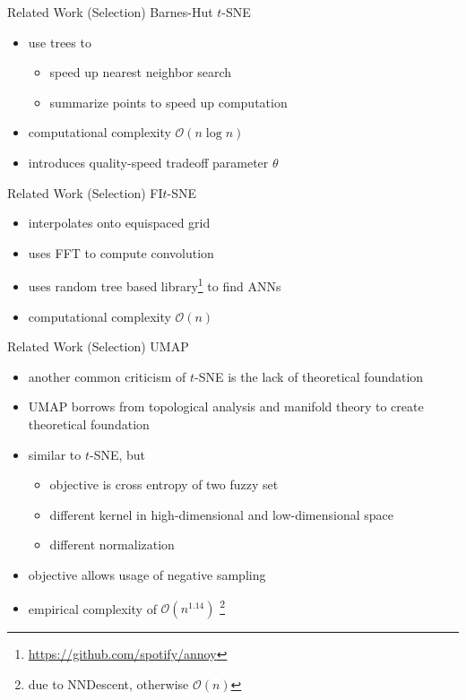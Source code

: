 \documentclass{beamer}
\begin{document}
\begin{frame}[fragile]{Related Work (Selection)}
    Barnes-Hut $t$-SNE
    \begin{itemize}
        \item use trees to
            \begin{itemize}
                \item speed up nearest neighbor search
                \item summarize points to speed up computation
            \end{itemize}
        \item computational complexity $\mathcal{O}(n \log n)$
        \item introduces quality-speed tradeoff parameter $\theta$
    \end{itemize}
\end{frame}

\begin{frame}[fragile]{Related Work (Selection)}
    FI$t$-SNE
    \begin{itemize}
        \item interpolates onto equispaced grid
        \item uses FFT to compute convolution
        \item uses random tree based library\footnote{\url{https://github.com/spotify/annoy}} to find ANNs
        \item computational complexity $\mathcal{O}(n)$
    \end{itemize}
\end{frame}

\begin{frame}[fragile]{Related Work (Selection)}
    UMAP
    \begin{itemize}
        \item another common criticism of $t$-SNE is the lack of theoretical foundation
        \item UMAP borrows from topological analysis and manifold theory to create theoretical foundation
        \item similar to $t$-SNE, but
            \begin{itemize}
                \item objective is cross entropy of two fuzzy set
                \item different kernel in high-dimensional and low-dimensional space
                \item different normalization
            \end{itemize}
        \item objective allows usage of negative sampling
        \item empirical complexity of $\mathcal{O}(n^{1.14})$ \footnote{due to NNDescent, otherwise $\mathcal{O}(n)$}
    \end{itemize}
\end{frame}
\end{document}
